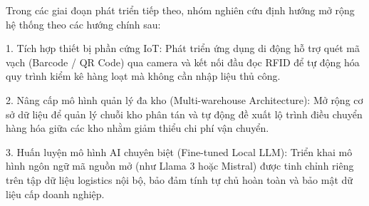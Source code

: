 Trong các giai đoạn phát triển tiếp theo, nhóm nghiên cứu định hướng mở rộng hệ thống theo các hướng chính sau:

1. Tích hợp thiết bị phần cứng IoT: Phát triển ứng dụng di động hỗ trợ quét mã vạch (Barcode / QR Code) qua camera và kết nối đầu đọc RFID để tự động hóa quy trình kiểm kê hàng loạt mà không cần nhập liệu thủ công.

2. Nâng cấp mô hình quản lý đa kho (Multi-warehouse Architecture): Mở rộng cơ sở dữ liệu để quản lý chuỗi kho phân tán và tự động đề xuất lộ trình điều chuyển hàng hóa giữa các kho nhằm giảm thiểu chi phí vận chuyển.

3. Huấn luyện mô hình AI chuyên biệt (Fine-tuned Local LLM): Triển khai mô hình ngôn ngữ mã nguồn mở (như Llama 3 hoặc Mistral) được tinh chỉnh riêng trên tập dữ liệu logistics nội bộ, bảo đảm tính tự chủ hoàn toàn và bảo mật dữ liệu cấp doanh nghiệp.

